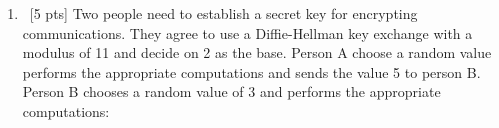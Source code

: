 \documentclass[12pt]{article}
\newenvironment{sol}[1][Solution]{\begin{trivlist}\item[\hskip\labelsep {\bfseries #1:}]}{\end{trivlist}}
\begin{document}
\begin{enumerate}
    \item \ [5 pts] Two people need to establish a secret key for encrypting communications. They agree to use a Diffie-Hellman key exchange with a modulus of 11 and decide on 2 as the base. Person A choose a random value performs the appropriate computations and sends the value 5 to person B. Person B chooses a random value of 3 and performs the appropriate computations:


\end{enumerate}
\end{document}
